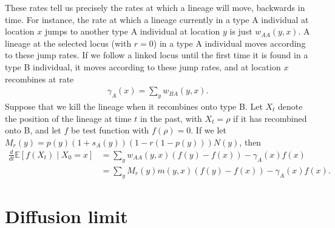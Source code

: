 \documentclass{article}
\newcommand{\E}{\mathbb{E}}
\newcommand{\deriv}[1]{\frac{d}{d#1}}
\newcommand{\given}{\;\vert\;}
\begin{document}
These rates tell us precisely the rates at which a lineage will move, backwards in time.
For instance, the rate at which a lineage currently in a type A individual at location $x$
jumps to another type A individual at location $y$ is just $w_{AA}(y,x)$.
A lineage at the selected locus (with $r=0$) in a type A individual moves according to these jump rates.
If we follow a linked locus until the first time it is found in a type B individual,
it moves according to these jump rates, and at location $x$ recombines at rate
\begin{align}
    \gamma_A(x) = \sum_y w_{BA}(y,x) .
\end{align}
Suppose that we kill the lineage when it recombines onto type B.
Let $X_t$ denote the position of the lineage at time $t$ in the past,
with $X_t = \rho$ if it has recombined onto B,
and let $f$ be test function with $f(\rho)=0$.
If we let $M_r(y) = p(y) (1+s_A(y)) \left(1 - r (1-p(y)) \right)  N(y)$, then
\begin{align}
    \deriv{t} \E[f(X_t) \given X_0=x ] &= \sum_y w_{AA}(y,x) ( f(y)-f(x) ) - \gamma_A(x) f(x) \\
                                       &= \sum_y  M_r(y) m(y,x) ( f(y) - f(x)  ) - \gamma_A(x) f(x) .
\end{align}

\section{Diffusion limit}
\end{document}
